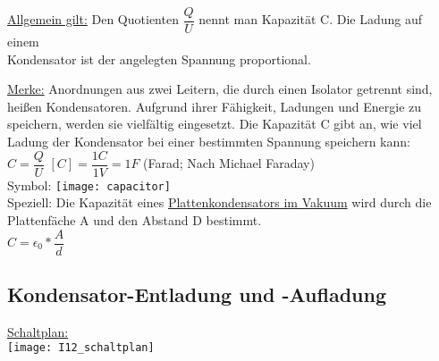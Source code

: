 \documentclass[12pt]{scrartcl}
\begin{document}
\begin{flushleft}
			\vspace{5mm}
			\underline{Allgemein gilt:}
			Den Quotienten $\dfrac{Q}{U}$ nennt man Kapazität C. Die Ladung auf einem \\ \vspace{2mm}
			Kondensator ist der angelegten Spannung proportional.
			
			\vspace{5mm}
			\underline{Merke:}
			Anordnungen aus zwei Leitern, die durch einen Isolator getrennt sind, heißen Kondensatoren. Aufgrund ihrer Fähigkeit, Ladungen und Energie zu speichern, werden sie vielfältig eingesetzt. Die Kapazität C gibt an, wie viel Ladung der Kondensator bei einer bestimmten Spannung speichern kann:
			\vspace{2mm} \\
			$ C = \dfrac{Q}{U} $ \hspace{5mm} $ [C] = \dfrac{1C}{1V} = 1F $ (Farad; Nach Michael Faraday)
			\vspace{5mm} \\
			Symbol: \texttt{[image: capacitor]}
			\vspace{5mm} \\
			Speziell: Die Kapazität eines \underline{Plattenkondensators im Vakuum} wird durch die Plattenfäche A und den Abstand D bestimmt. 
			\vspace{2mm} \\
			$ C = \epsilon_{0} \ast \dfrac{A}{d} $
			\newpage
		\subsection{Kondensator-Entladung und -Aufladung}
		\underline{Schaltplan:}
		\vspace{2mm} \\
		\texttt{[image: I12\_schaltplan]}
		\vspace{2mm}
		

\end{flushleft}
\end{document}
